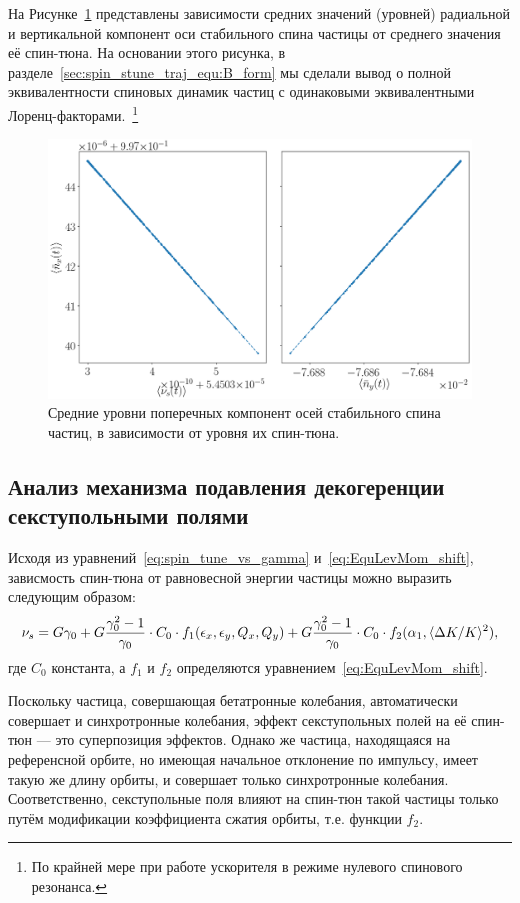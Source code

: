 На Рисунке~\ref{decoh:fig:nbar_vs_ST} представлены зависимости средних значений (уровней) радиальной и вертикальной компонент оси стабильного спина частицы от среднего значения её спин-тюна. На основании этого рисунка, в разделе~\ref{sec:spin_stune_traj_equ:B_form} мы сделали вывод о полной эквивалентности спиновых динамик частиц с одинаковыми эквивалентными Лоренц-факторами.~\footnote{По крайней мере при работе ускорителя в режиме нулевого спинового резонанса.}
\begin{figure}[!h]
	\centering
	\includegraphics[width=\linewidth]{images/decoh_sim/mean_n_bar_vs_spin_tune}
	\caption{Средние уровни поперечных компонент осей стабильного спина частиц, в зависимости от уровня их спин-тюна.\label{decoh:fig:nbar_vs_ST}}
\end{figure}

\subsection{Анализ механизма подавления декогеренции секступольными полями}\label{sec:sext_decoh_suppression_effect_analysis}
Исходя из уравнений~\eqref{eq:spin_tune_vs_gamma} и~\eqref{eq:EquLevMom_shift}, зависмость спин-тюна от равновесной энергии частицы можно выразить следующим образом:
\[
\nu_s = G\gamma_0 + G\frac{\gamma_0^2-1}{\gamma_0}\cdot C_0\cdot f_1(\epsilon_x, \epsilon_y, Q_x, Q_y)+ G\frac{\gamma_0^2-1}{\gamma_0}\cdot C_0\cdot f_2(\alpha_1, \avg{\Delta K/K}^2),
\]
где $C_0$ константа, а $f_1$ и $f_2$ определяются уравнением~\eqref{eq:EquLevMom_shift}.

Поскольку частица, совершающая бетатронные колебания, автоматически совершает и синхротронные колебания, эффект секступольных полей на её спин-тюн --- это суперпозиция эффектов. Однако же частица, находящаяся на референсной орбите, но имеющая начальное отклонение по импульсу, имеет такую же длину орбиты, и совершает только синхротронные колебания. Соответственно, секступольные поля влияют на спин-тюн такой частицы только путём модификации коэффициента сжатия орбиты, т.е. функции $f_2$. 

